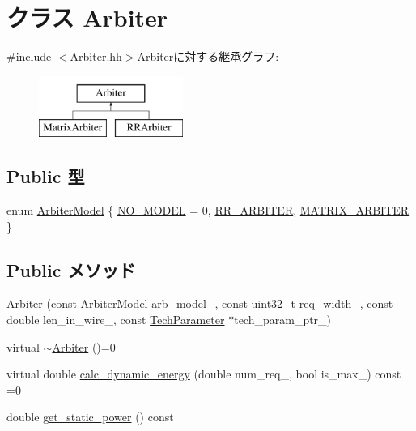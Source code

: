 \hypertarget{classArbiter}{
\section{クラス Arbiter}
\label{classArbiter}
}


{\ttfamily \#include $<$Arbiter.hh$>$}Arbiterに対する継承グラフ:\begin{figure}[H]
\begin{center}
\leavevmode
\includegraphics[height=2cm]{classArbiter}
\end{center}
\end{figure}
\subsection*{Public 型}
\begin{DoxyCompactItemize}
\item 
enum \hyperlink{classArbiter_a7c7da240d2e3c4e80b6a4ff22a3a2ce5}{ArbiterModel} \{ \hyperlink{classArbiter_a7c7da240d2e3c4e80b6a4ff22a3a2ce5abab57b6e2c553e4d983f415a1f4ea75b}{NO\_\-MODEL} =  0, 
\hyperlink{classArbiter_a7c7da240d2e3c4e80b6a4ff22a3a2ce5a28977651d2b351b14aa831cdbf1f24ff}{RR\_\-ARBITER}, 
\hyperlink{classArbiter_a7c7da240d2e3c4e80b6a4ff22a3a2ce5a0fd7b312f9fc53fbcb70f2d09bdf82a4}{MATRIX\_\-ARBITER}
 \}
\end{DoxyCompactItemize}
\subsection*{Public メソッド}
\begin{DoxyCompactItemize}
\item 
\hyperlink{classArbiter_a84a0961d527c230288a18b2a3ea80f24}{Arbiter} (const \hyperlink{classArbiter_a7c7da240d2e3c4e80b6a4ff22a3a2ce5}{ArbiterModel} arb\_\-model\_\-, const \hyperlink{Type_8hh_a435d1572bf3f880d55459d9805097f62}{uint32\_\-t} req\_\-width\_\-, const double len\_\-in\_\-wire\_\-, const \hyperlink{classTechParameter}{TechParameter} $\ast$tech\_\-param\_\-ptr\_\-)
\item 
virtual \hyperlink{classArbiter_aaae2c33d2f343df7d91f433cdcc6cba8}{$\sim$Arbiter} ()=0
\item 
virtual double \hyperlink{classArbiter_a11ad46c0a5f20df98190b479117a7dee}{calc\_\-dynamic\_\-energy} (double num\_\-req\_\-, bool is\_\-max\_\-) const =0
\item 
double \hyperlink{classArbiter_aeb5933543cfdeb1668baed5ce7c68351}{get\_\-static\_\-power} () const 
\end{DoxyCompactItemize}
